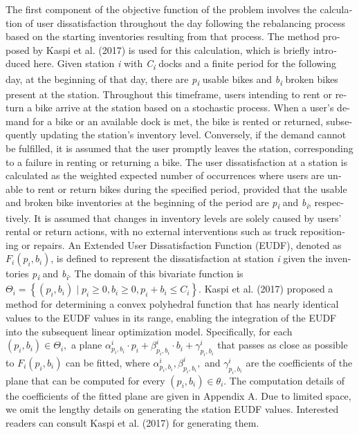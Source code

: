 \documentclass[
  english,
]{article}
\begin{document}
\begin{otherlanguage}{english}
\protect{}\label{p0185}
The first component of the objective function of the problem involves the calculation of user
dissatisfaction throughout the day following the rebalancing process based on the starting
inventories resulting from that process. The method proposed by Kaspi et al. (2017) is used for this
calculation, which is briefly introduced here. Given station \emph{i} with \emph{C\textsubscript{i}}
docks and a finite period for the following day, at the beginning of that day, there are
\emph{p\textsubscript{i}} usable bikes and \emph{b\textsubscript{i}} broken bikes present at the
station. Throughout this timeframe, users intending to rent or return a bike arrive at the station
based on a stochastic process. When a user's demand for a bike or an available dock is met, the bike
is rented or returned, subsequently updating the station's inventory level. Conversely, if the
demand cannot be fulfilled, it is assumed that the user promptly leaves the station, corresponding
to a failure in renting or returning a bike. The user dissatisfaction at a station is calculated as
the weighted expected number of occurrences where users are unable to rent or return bikes during
the specified period, provided that the usable and broken bike inventories at the beginning of the
period are \emph{p\textsubscript{i}} and \emph{b\textsubscript{i}}, respectively. It is assumed that
changes in inventory levels are solely caused by users' rental or return actions, with no external
interventions such as truck repositioning or repairs. An Extended User Dissatisfaction Function
(EUDF), denoted as \(F_{i}\left( {p_{i},b_{i}} \right)\), is defined to represent the
dissatisfaction at station \emph{i} given the inventories \emph{p\textsubscript{i}} and
\emph{b\textsubscript{i}}. The domain of this bivariate function is
\(\Theta_{i} = \left\{ {\left( {p_{i},b_{i}} \right) \mid p_{i} \geq 0,b_{i} \geq 0,p_{i} + b_{i} \leq C_{i}} \right\}\).
Kaspi et al. (2017) proposed a method for determining a convex polyhedral function that has nearly
identical values to the EUDF values in its range, enabling the integration of the EUDF into the
subsequent linear optimization model. Specifically, for each
\(\left( {p_{i},b_{i}} \right) \in \Theta_{i},\) a plane
\(\alpha_{p_{i},b_{i}}^{i} \cdot p_{i} + \beta_{p_{i},b_{i}}^{i} \cdot b_{i} + \gamma_{p_{i},b_{i}}^{i}\)
that passes as close as possible to \(F_{i}\left( {p_{i},b_{i}} \right)\) can be fitted, where
\(\alpha_{p_{i},b_{i}}^{i},\beta_{p_{i},b_{i}}^{i},\) and \(\gamma_{p_{i},b_{i}}^{i}\) are the
coefficients of the plane that can be computed for every
\(\left( {p_{i},b_{i}} \right) \in \theta_{i}\). The computation details of the coefficients of the
fitted plane are given in Appendix A. Due to limited space, we omit the lengthy details on
generating the station EUDF values. Interested readers can consult Kaspi et al. (2017) for
generating them.


\end{otherlanguage}
\end{document}
